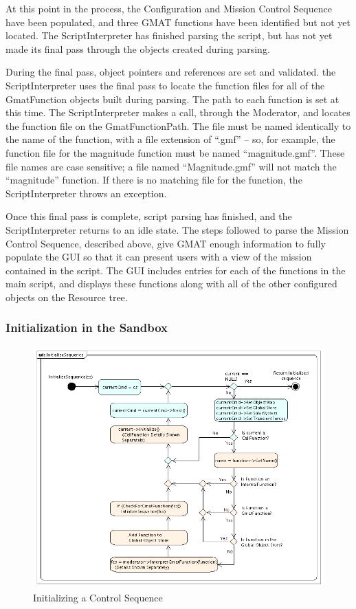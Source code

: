 At this point in the process, the Configuration and Mission Control Sequence have been populated,
and three GMAT functions have been identified but not yet located.  The ScriptInterpreter has
finished parsing the script, but has not yet made its final pass through the objects created during
parsing.

During the final pass, object pointers and references are set and validated.  the ScriptInterpreter
uses the final pass to locate the function files for all of the  GmatFunction objects built during
parsing.  The path to each function is set at this time.  The ScriptInterpreter makes a call,
through the Moderator, and locates the function file on the GmatFunctionPath.  The file must be
named identically to the name of the function, with a file extension of ``.gmf'' -- so, for example,
the function file for the magnitude function must be named  ``magnitude.gmf''.  These file names
are case sensitive; a file named ``Magnitude.gmf'' will not match the ``magnitude'' function.  If
there is no matching file for the function, the ScriptInterpreter throws an exception.

Once this final pass is complete, script parsing has finished, and the ScriptInterpreter returns to
an idle state.  The steps followed to parse the Mission Control Sequence, described above, give GMAT
enough information to fully populate the GUI so that it can present users with a view of the mission
contained in the script.  The GUI includes entries for each of the functions in the main script,
and displays these functions along with all of the other configured objects on the Resource tree.

\subsubsection{Initialization in the Sandbox}

\begin{figure}
\begin{center}
\includegraphics[378,312]{Images/InitializeSequence.png}
\caption{\label{figure:InitializeControlFunctionChapter}Initializing a Control Sequence}
\end{center}
\end{figure}

